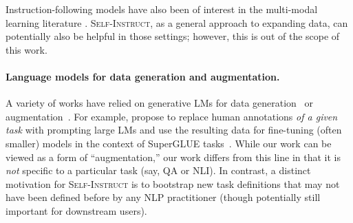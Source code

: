 \documentclass[11pt]{article}
\newcommand{\daniel}[1]{\textcolor{blue}{[DK: #1]}}
\newcommand{\nascomment}[1]{\textcolor{blue}{\textbf{[#1 -- \textsc{nas}]}}}
\newcommand{\name}{\textsc{Self-Instruct}}
\begin{document}
Instruction-following models have also been of interest in the multi-modal learning literature \cite{fried2018speaker, shridhar2020alfred, min2022film, weir2022one}.
\name{}, as a general approach to expanding data, can potentially also be helpful in those settings; however, this is out of the scope of this work.

    

\paragraph{Language models for data generation and augmentation.}
A variety of works have relied on generative LMs for data generation~\cite{schick2021generating,wang2021towards,liu2022wanli,meng2022tuning} or augmentation~\cite{feng2021survey,yang2020generative,mekala2022intermediate}.  For example, \citet{schick2021generating} propose to replace human annotations \emph{of a given task} with prompting large LMs and use the resulting data for fine-tuning (often smaller) models in the context of SuperGLUE tasks~\cite{wang2019superglue}. 
While our work can be viewed as a form of ``augmentation,'' our work differs from this line in that it is \emph{not} specific to a particular task (say, QA or NLI). In contrast, a distinct motivation for \name{} is to bootstrap new task definitions that may not have been defined before by any NLP practitioner (though potentially still important for downstream users).  


    
    
\end{document}

